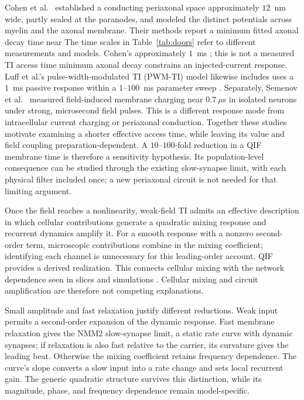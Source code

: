 \documentclass[11pt,a4paper]{article}
\providecommand{\DIFaddtex}[1]{{\protect\color{blue} \sf #1}} %
\providecommand{\DIFdeltex}[1]{{\protect\color{red} \scriptsize #1}} %
\providecommand{\DIFaddbegin}{} %
\providecommand{\DIFaddend}{} %
\providecommand{\DIFdelbegin}{} %
\providecommand{\DIFdelend}{} %
\providecommand{\DIFadd}[1]{\texorpdfstring{\DIFaddtex{#1}}{#1}} %
\providecommand{\DIFdel}[1]{\texorpdfstring{\DIFdeltex{#1}}{}} %
\begin{document}
\DIFdelbegin \DIFdel{Cohen et al.\ \cite{cohen2020periaxonal} established a conducting periaxonal space
approximately $12$~nm wide, partly sealed at the paranodes, and modeled the distinct
potentials across myelin and the axonal membrane.
Their methods report a minimum
fitted axonal decay time near }\DIFdelend \DIFaddbegin \DIFadd{The time scales in Table~\ref{tab:doors} refer to different measurements and models.
Cohen's approximately }\DIFaddend $1$~ms \DIFdelbegin \DIFdel{; this is not a measured TI access time}\DIFdelend \DIFaddbegin \DIFadd{minimum axonal decay constrains an injected-current
response}\DIFaddend . Luff et al.'s pulse-width-modulated TI (PWM-TI) model \DIFdelbegin \DIFdel{likewise includes }\DIFdelend \DIFaddbegin \DIFadd{uses }\DIFaddend a $1$~ms passive response within a
$1$--$100$~ms parameter sweep \cite{luff2024}. Separately, Semenov et al.\
\cite{semenov2025} measured field-induced membrane charging near $0.7~\mu$s in
isolated neurons under strong, microsecond field pulses. This is a different
response mode from intracellular current charging or periaxonal conduction.
Together these studies motivate examining a shorter effective access time, while
leaving its value and field coupling preparation-dependent. A $10$--$100$-fold
reduction in a QIF membrane time is therefore a sensitivity hypothesis. Its
population-level consequence can be studied through the existing slow-synapse
limit, with each physical filter included once; a new periaxonal circuit is not
needed for that limiting argument.

\DIFaddbegin \DIFadd{Once the field reaches a nonlinearity, weak-field TI admits an effective
description in which cellular contributions generate a quadratic mixing response
and recurrent dynamics amplify it. For a smooth response with a nonzero
second-order term, microscopic contributions combine in the mixing coefficient;
identifying each channel is unnecessary for this leading-order account. QIF
provides a derived realization. This connects cellular mixing
\cite{mirzakhalili2020,luff2024mixer} with the network dependence seen in slices
and simulations \cite{caldas2024,karimi2024,soroushi2025}. Cellular mixing and
circuit amplification are therefore not competing explanations.
}

\DIFadd{Small amplitude and fast relaxation justify different reductions. Weak input
permits a second-order expansion of the dynamic response. Fast membrane
relaxation gives the NMM2 slow-synapse limit, a static rate curve with dynamic
synapses; if relaxation is also fast relative to the carrier, its curvature
gives the leading beat. Otherwise the mixing coefficient retains frequency
dependence. The curve's slope converts a slow input into a rate change and sets
local recurrent gain. The generic quadratic structure survives this distinction,
while its magnitude, phase, and frequency dependence remain model-specific.
}
\end{document}
